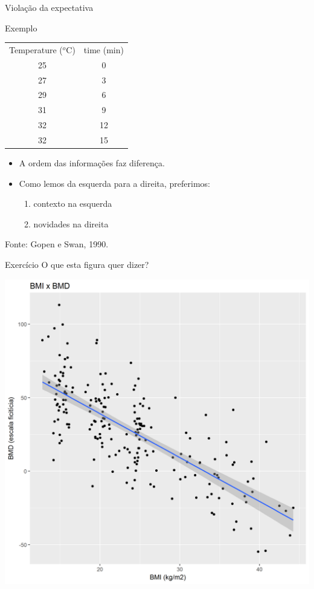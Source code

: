 \documentclass{beamer}
\begin{document}
\begin{frame}{Violação da expectativa}
  \begin{exampleblock}{Exemplo}
    \footnotesize
    \begin{center}
    \begin{tabular}{cc}
      Temperature ($^o$C) & time (min) \\
      25 & 0 \\
      27 & 3 \\
      29 & 6\\
      31 & 9\\
      32 & 12\\
      32 & 15 \\
    \end{tabular}
  \end{center}
  \end{exampleblock}
  \begin{itemize}
    \footnotesize
  \item A \alert{ordem} das informações faz diferença.
  \item Como lemos da esquerda para a direita, preferimos:
    \begin{enumerate}
      \scriptsize
    \item contexto na esquerda
    \item novidades na direita
    \end{enumerate}
  \end{itemize}

  \vfill
  \scriptsize
  \hfill Fonte: Gopen e Swan, 1990.
\end{frame}

\begin{frame}{Exercício}
  O que esta figura quer dizer?
  \begin{center}
    \includegraphics[height=.8\textheight]{Escrita/exercicio-figura}
  \end{center}
\end{frame}
\end{document}
